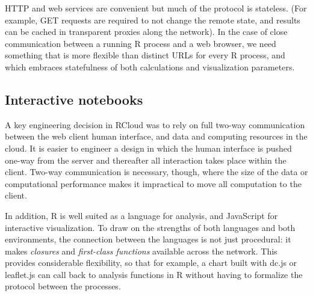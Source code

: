 HTTP and web services are convenient but much of the protocol is
stateless. (For example, GET requests are required to not change the
remote state, and results can be cached in transparent proxies along
the network). In the case of close communication between a running
R process and a web browser, we need something that is more flexible
than distinct URLs for every R process, and which embraces
statefulness of both calculations and visualization parameters.



\subsection{Interactive notebooks\label{sec:interactivenotebooks}}




A key engineering decision in RCloud was to rely on full two-way
communication between the web client human interface, and data and
computing resources in the cloud. It is easier to engineer a design
in which the human interface is pushed one-way from the server
and thereafter all interaction takes place within the client.
Two-way communication is necessary, though, where the size of
the data or computational performance makes it impractical to
move all computation to the client.

In addition, R is well suited as a language for analysis, and
JavaScript for interactive visualization. To draw on
the strengths of both languages and both environments, the connection
between the languages is not just procedural: it makes \emph{closures}
and \emph{first-class functions} available across the network.
This provides considerable flexibility, so that for example, a chart built
with dc.js or leaflet.js can call back to analysis functions in R
without having to formalize the protocol between the processes.

